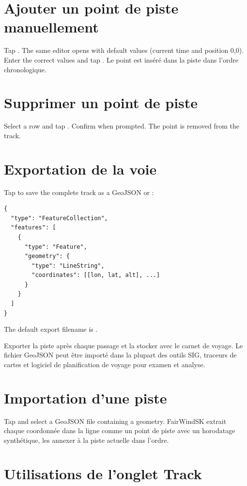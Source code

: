 \section{Ajouter un point de piste manuellement}

Tap . The same editor opens with default values (current time and position 0,0).
Enter the correct values and tap .
Le point est inséré dans la piste dans l'ordre chronologique.

\section{Supprimer un point de piste}

Select a row and tap . Confirm when prompted. The point is removed from the track.

\section{Exportation de la voie}

Tap  to save the complete track as a GeoJSON  or
:

\begin{lstlisting}
{
  "type": "FeatureCollection",
  "features": [
    {
      "type": "Feature",
      "geometry": {
        "type": "LineString",
        "coordinates": [[lon, lat, alt], ...]
      }
    }
  ]
}
\end{lstlisting}

The default export filename is .

\begin{tipbox}
Exporter la piste après chaque passage et la stocker avec le carnet de voyage.
Le fichier GeoJSON peut être importé dans la plupart des outils SIG, traceurs de cartes et logiciel de planification de voyage
pour examen et analyse.
\end{tipbox}

\section{Importation d'une piste}

Tap  and select a GeoJSON file containing a  geometry.
FairWindSK extrait chaque coordonnée dans la ligne comme un point de piste avec un horodatage synthétique,
les annexer à la piste actuelle dans l'ordre.

\section{Utilisations de l'onglet Track}

